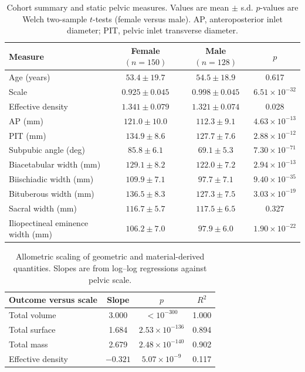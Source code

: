 \documentclass[openacc]{rsproca_new}
\begin{document}
\begin{table}[p]
\centering
\caption{Cohort summary and static pelvic measures. Values are mean $\pm$ s.d. $p$-values are Welch two-sample $t$-tests (female versus male). AP, anteroposterior inlet diameter; PIT, pelvic inlet transverse diameter.}
\label{tab:cohort}
\begin{tabular}{lccc}
\toprule
Measure & Female $(n=150)$ & Male $(n=128)$ & $p$ \\
\midrule
Age (years) & $53.4 \pm 19.7$ & $54.5 \pm 18.9$ & 0.617 \\
Scale & $0.925 \pm 0.045$ & $0.998 \pm 0.045$ & $6.51 \times 10^{-32}$ \\
Effective density & $1.341 \pm 0.079$ & $1.321 \pm 0.074$ & 0.028 \\
AP (mm) & $121.0 \pm 10.0$ & $112.3 \pm 9.1$ & $4.63 \times 10^{-13}$ \\
PIT (mm) & $134.9 \pm 8.6$ & $127.7 \pm 7.6$ & $2.88 \times 10^{-12}$ \\
Subpubic angle (deg) & $85.8 \pm 6.1$ & $69.1 \pm 5.3$ & $7.30 \times 10^{-71}$ \\
Biacetabular width (mm) & $129.1 \pm 8.2$ & $122.0 \pm 7.2$ & $2.94 \times 10^{-13}$ \\
Biischiadic width (mm) & $109.9 \pm 7.1$ & $97.7 \pm 7.1$ & $9.40 \times 10^{-35}$ \\
Bituberous width (mm) & $136.5 \pm 8.3$ & $127.3 \pm 7.5$ & $3.03 \times 10^{-19}$ \\
Sacral width (mm) & $116.7 \pm 5.7$ & $117.5 \pm 6.5$ & 0.327 \\
Iliopectineal eminence width (mm) & $106.2 \pm 7.0$ & $97.9 \pm 6.0$ & $1.90 \times 10^{-22}$ \\
\bottomrule
\end{tabular}
\end{table}

\begin{table}[p]
\centering
\caption{Allometric scaling of geometric and material-derived quantities. Slopes are from log--log regressions against pelvic scale.}
\label{tab:allometry}
\begin{tabular}{lccc}
\toprule
Outcome versus scale & Slope & $p$ & $R^2$ \\
\midrule
Total volume & 3.000 & $<10^{-300}$ & 1.000 \\
Total surface & 1.684 & $2.53 \times 10^{-136}$ & 0.894 \\
Total mass & 2.679 & $2.48 \times 10^{-140}$ & 0.902 \\
Effective density & $-0.321$ & $5.07 \times 10^{-9}$ & 0.117 \\
\bottomrule
\end{tabular}
\end{table}
\end{document}
